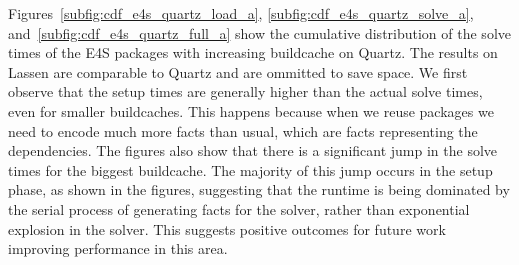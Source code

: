 Figures~\ref{subfig:cdf_e4s_quartz_load_a}, \ref{subfig:cdf_e4s_quartz_solve_a}, and~\ref{subfig:cdf_e4s_quartz_full_a} show the cumulative distribution of the solve times of the E4S packages with increasing buildcache on Quartz. The results on Lassen are comparable to Quartz and are ommitted to save space. We first observe that the setup times are generally higher than the actual solve times, even for smaller buildcaches. This happens because when we reuse packages we need to encode much more facts than usual, which are facts representing the dependencies. The figures also show that there is a significant jump in the solve times for the biggest buildcache. The majority of this jump occurs in the setup phase, as shown in the figures, suggesting that the runtime is being dominated by the serial process of generating facts for the solver, rather than exponential explosion in the solver. This suggests positive outcomes for future work improving performance in this area.

% 

